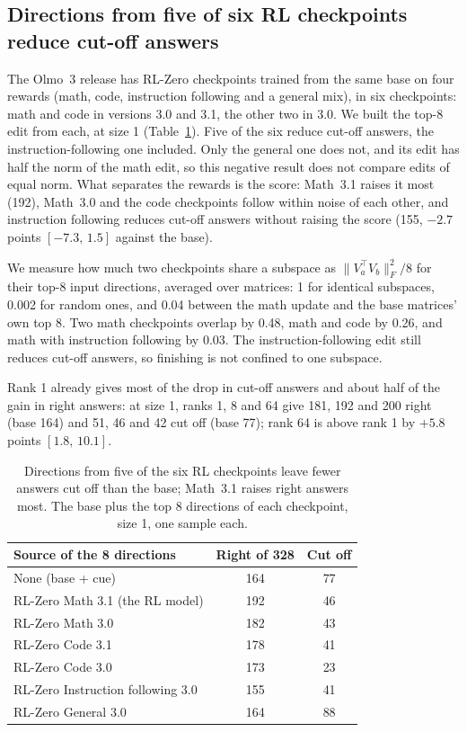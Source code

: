 \documentclass[10pt]{article}
\newcommand{\ci}[2]{$[#1,\,#2]$}
\begin{document}
\subsection{Directions from five of six RL checkpoints reduce cut-off answers}\label{sec:reward}

The Olmo~3 release has RL-Zero checkpoints trained from the same base on four rewards (math, code, instruction
following and a general mix), in six checkpoints: math and code in versions 3.0 and 3.1, the other two in 3.0. We
built the top-8 edit from each, at size 1 (Table~\ref{tab:reward}). Five of the six reduce cut-off answers, the
instruction-following one included. Only the general one does not, and its edit has half the norm of the math edit,
so this negative result does not compare edits of equal norm. What separates the rewards is the score: Math~3.1
raises it most (192), Math~3.0 and the code checkpoints follow within noise of each other, and instruction following
reduces cut-off answers without raising the score (155, $-2.7$ points \ci{-7.3}{1.5} against the base).

We measure how much two checkpoints share a subspace as $\|V_a^{\top} V_b\|_F^2 / 8$ for their top-8 input
directions, averaged over matrices: 1 for identical subspaces, 0.002 for random ones, and 0.04 between the math
update and the base matrices' own top 8. Two math checkpoints overlap by 0.48, math and code by 0.26, and math with
instruction following by 0.03. The instruction-following edit still reduces cut-off answers, so finishing is not
confined to one subspace.

Rank 1 already gives most of the drop in cut-off answers and about half of the gain in right answers: at size 1,
ranks 1, 8 and 64 give 181, 192 and 200 right (base 164) and 51, 46 and 42 cut off (base 77); rank 64 is above
rank 1 by $+5.8$ points \ci{1.8}{10.1}.

\begin{table}[h]
\centering\small
\begin{tabular}{@{}lcc@{}}
\toprule
Source of the 8 directions & Right of 328 & Cut off \\
\midrule
None (base + cue) & 164 & 77 \\
RL-Zero Math 3.1 (the RL model) & 192 & 46 \\
RL-Zero Math 3.0 & 182 & 43 \\
RL-Zero Code 3.1 & 178 & 41 \\
RL-Zero Code 3.0 & 173 & 23 \\
RL-Zero Instruction following 3.0 & 155 & 41 \\
RL-Zero General 3.0 & 164 & 88 \\
\bottomrule
\end{tabular}
\caption{Directions from five of the six RL checkpoints leave fewer answers cut off than the base; Math~3.1
raises right answers most. The base plus the top 8 directions of each checkpoint, size 1, one sample each.}
\label{tab:reward}
\end{table}
\end{document}
